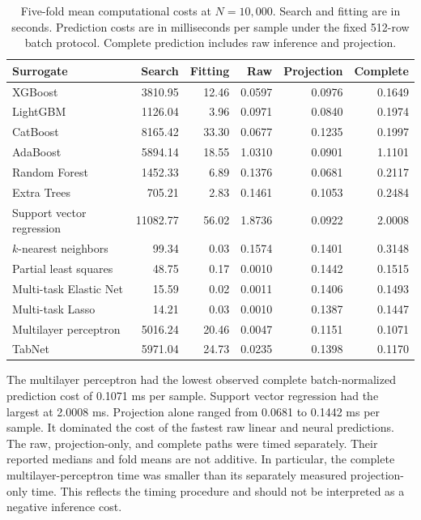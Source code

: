 \begin{table}[htbp]
\centering\footnotesize
\setlength{\tabcolsep}{3pt}
\caption{Five-fold mean computational costs at $N=10{,}000$. Search and fitting are in seconds. Prediction costs are in milliseconds per sample under the fixed 512-row batch protocol. Complete prediction includes raw inference and projection.}
\label{tab:projection_timing_results}
\begin{tabular}{p{3.7cm}rrrrr}
\toprule
Surrogate & Search & Fitting & Raw & Projection & Complete\\
\midrule
XGBoost & 3810.95 & 12.46 & 0.0597 & 0.0976 & 0.1649\\
LightGBM & 1126.04 & 3.96 & 0.0971 & 0.0840 & 0.1974\\
CatBoost & 8165.42 & 33.30 & 0.0677 & 0.1235 & 0.1997\\
AdaBoost & 5894.14 & 18.55 & 1.0310 & 0.0901 & 1.1101\\
Random Forest & 1452.33 & 6.89 & 0.1376 & 0.0681 & 0.2117\\
Extra Trees & 705.21 & 2.83 & 0.1461 & 0.1053 & 0.2484\\
Support vector regression & 11082.77 & 56.02 & 1.8736 & 0.0922 & 2.0008\\
$k$-nearest neighbors & 99.34 & 0.03 & 0.1574 & 0.1401 & 0.3148\\
Partial least squares & 48.75 & 0.17 & 0.0010 & 0.1442 & 0.1515\\
Multi-task Elastic Net & 15.59 & 0.02 & 0.0011 & 0.1406 & 0.1493\\
Multi-task Lasso & 14.21 & 0.03 & 0.0010 & 0.1387 & 0.1447\\
Multilayer perceptron & 5016.24 & 20.46 & 0.0047 & 0.1151 & 0.1071\\
TabNet & 5971.04 & 24.73 & 0.0235 & 0.1398 & 0.1170\\
\bottomrule
\end{tabular}
\end{table}

The multilayer perceptron had the lowest observed complete batch-normalized prediction cost of 0.1071 ms per sample. Support vector regression had the largest at 2.0008 ms. Projection alone ranged from 0.0681 to 0.1442 ms per sample. It dominated the cost of the fastest raw linear and neural predictions. The raw, projection-only, and complete paths were timed separately. Their reported medians and fold means are not additive. In particular, the complete multilayer-perceptron time was smaller than its separately measured projection-only time. This reflects the timing procedure and should not be interpreted as a negative inference cost.

